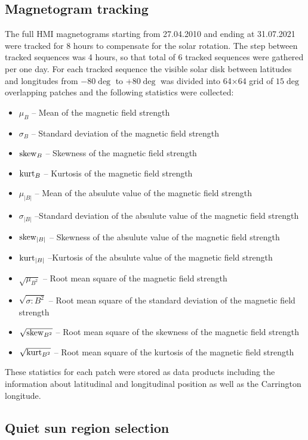 \documentclass{aa}
\begin{document}
\subsection{Magnetogram tracking}
The full HMI magnetograms starting from 27.04.2010 and ending at 31.07.2021 were tracked for 8 hours to compensate for the solar rotation. The step between tracked sequences was 4 hours, so that total of 6 tracked sequences were gathered per one day. For each tracked sequence the visible solar disk between latitudes and longitudes from $-80\deg$ to +$80\deg$ was divided into 64$\times$64 grid of $15\deg$ overlapping patches and the following statistics were collected:
\begin{itemize}
	\item $\mu_B$ -- Mean of the magnetic field strength
	\item $\sigma_B$ -- Standard deviation of the magnetic field strength
	\item ${\rm skew}_B$ -- Skewness of the magnetic field strength
	\item ${\rm kurt}_B$ -- Kurtosis of the magnetic field strength
	\item $\mu_{|B|}$ -- Mean of the absulute value of the magnetic field strength
    \item $\sigma_{|B|}$ --Standard deviation of the absulute value of the magnetic field strength
    \item ${\rm skew}_{|B|}$ -- Skewness of the absulute value of the magnetic field strength
    \item ${\rm kurt}_{|B|}$ --Kurtosis of the absulute value of the magnetic field strength
	\item $\sqrt{\mu_{B^2}}$ -- Root mean square of the magnetic field strength
    \item $\sqrt{\sigma:{B^2}}$ -- Root mean square of the standard deviation of the magnetic field strength
    \item $\sqrt{{\rm skew}_{B^2}}$ -- Root mean square of the skewness of the magnetic field strength
    \item $\sqrt{{\rm kurt}_{B^2}}$ -- Root mean square of the kurtosis of the magnetic field strength
\end{itemize}
These statistics for each patch were stored as data products including the information about latitudinal and longitudinal position as well as the Carrington longitude.

\subsection{Quiet sun region selection}
\end{document}
